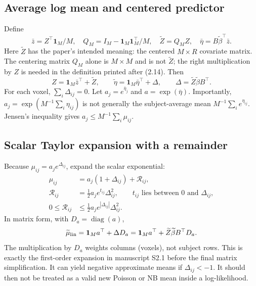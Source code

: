 \documentclass[11pt,a4paper]{article}
\newcommand{\diag}{\operatorname{diag}}
\numberwithin{equation}{section}
\begin{document}
\subsection{Average log mean and centered predictor}
Define
\[
 \bar z=Z^\top\mathbf1_M/M,\quad
 Q_M=I_M-\mathbf1_M\mathbf1_M^\top/M,\quad
 \widetilde Z=Q_MZ,\quad \bar\eta=B\widetilde\beta^\top\bar z.
\]
Here $\widetilde Z$ has the paper's intended meaning: the centered
$M\times R$ covariate matrix. The centering matrix $Q_M$ alone
is $M\times M$ and is not $\widetilde Z$; the right multiplication
by $Z$ is needed in the definition printed after (2.14).
Then
\[
 Z=\mathbf1_M\bar z^\top+\widetilde Z,\qquad
 \widetilde\eta=\mathbf1_M\bar\eta^\top+\Delta,\qquad
 \Delta=\widetilde Z\widetilde\beta B^\top.
\]
For each voxel, $\sum_i\Delta_{ij}=0$.
Let $a_j=e^{\bar\eta_j}$ and $a=\exp(\bar\eta)$.
Importantly,
$a_j=\exp(M^{-1}\sum_i\eta_{ij})$ is not generally the
subject-average mean $M^{-1}\sum_i e^{\eta_{ij}}$.
Jensen's inequality gives $a_j\le M^{-1}\sum_i\mu_{ij}$.

\subsection{Scalar Taylor expansion with a remainder}
Because $\mu_{ij}=a_j e^{\Delta_{ij}}$, expand the scalar exponential:
\begin{align}
 \mu_{ij}
 &=a_j(1+\Delta_{ij})+\mathcal R_{ij},\\
 \mathcal R_{ij}
 &=\frac12a_j e^{t_{ij}}\Delta_{ij}^2,\qquad
 t_{ij}\text{ lies between }0\text{ and }\Delta_{ij},\\
 0\le\mathcal R_{ij}
 &\le\frac12a_j e^{|\Delta_{ij}|}\Delta_{ij}^2.
 \label{lesion-taylor-remainder}
\end{align}
In matrix form, with $D_a=\diag(a)$,
\begin{equation}
 \widetilde\mu_{\rm lin}
 =\mathbf1_M a^\top+\Delta D_a
 =\mathbf1_M a^\top+\widetilde Z\widetilde\beta B^\top D_a.
 \label{lesion-linear-mean}
\end{equation}
The multiplication by $D_a$ weights columns (voxels), not subject rows.
This is exactly the first-order expansion in manuscript S2.1 before
the final matrix simplification.
It can yield negative approximate means if $\Delta_{ij}<-1$.
It should then not be treated as a valid new Poisson or NB mean
inside a log-likelihood.
\end{document}
